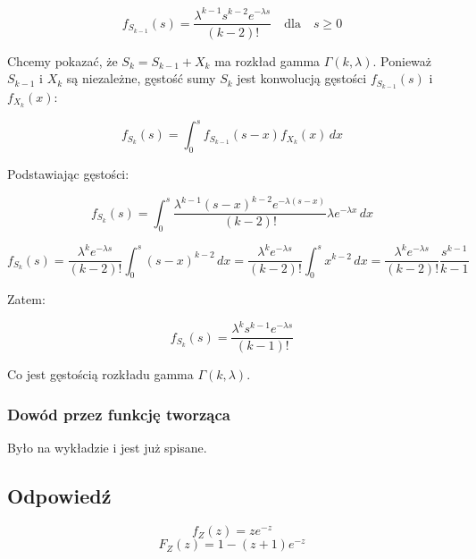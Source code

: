 \[
	f_{S_{k-1}}(s) = \frac{\lambda^{k-1} s^{k-2} e^{-\lambda s}}{(k-2)!} \quad \text{dla} \quad s \geq 0
\]

Chcemy pokazać, że \( S_k = S_{k-1} + X_k \) ma rozkład gamma \( \Gamma(k, \lambda) \). Ponieważ \( S_{k-1} \) i \( X_k \) są niezależne, gęstość sumy \( S_k \) jest konwolucją gęstości \( f_{S_{k-1}}(s) \) i \( f_{X_k}(x) \):

\[
	f_{S_k}(s) = \int_0^s f_{S_{k-1}}(s - x) f_{X_k}(x) \, dx
\]

Podstawiając gęstości:

\[
	f_{S_k}(s) = \int_0^s \frac{\lambda^{k-1} (s-x)^{k-2} e^{-\lambda (s-x)}}{(k-2)!} \lambda e^{-\lambda x} \, dx
\]


\[
	f_{S_k}(s) = \frac{\lambda^k e^{-\lambda s}}{(k-2)!} \int_0^s (s-x)^{k-2} \, dx = \frac{\lambda^k e^{-\lambda s}}{(k-2)!} \int_0^s x^{k-2} \, dx
	= \frac{\lambda^k e^{-\lambda s}}{(k-2)!}\frac{s^{k-1}}{k-1}
\]

Zatem:

\[
	f_{S_k}(s) = \frac{\lambda^k s^{k-1} e^{-\lambda s}}{(k-1)!}
\]

Co jest gęstością rozkładu gamma \( \Gamma(k, \lambda) \).

\subsubsection*{Dowód przez funkcję tworząca}

Było na wykładzie i jest już spisane.

\subsection*{Odpowiedź}
\[
	\boxed{f_Z(z) = z e^{-z}}
\]
\[
	\boxed{F_Z(z) = 1 - (z + 1)e^{-z}}
\]